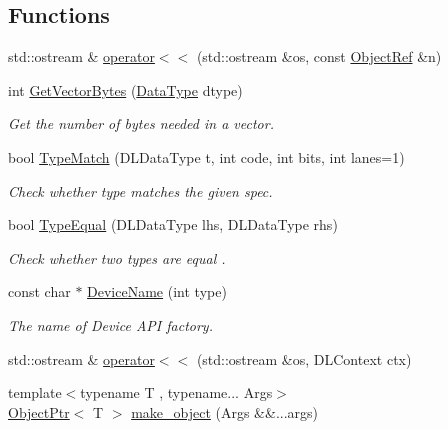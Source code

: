 \subsection*{Functions}
\begin{DoxyCompactItemize}
\item 
std\+::ostream \& \hyperlink{namespacetvm_1_1runtime_af22b89284299c81d0c1802199af446d7}{operator$<$$<$} (std\+::ostream \&os, const \hyperlink{classtvm_1_1runtime_1_1ObjectRef}{Object\+Ref} \&n)
\item 
int \hyperlink{namespacetvm_1_1runtime_ad01a53416152b68029d67190c3709d25}{Get\+Vector\+Bytes} (\hyperlink{classtvm_1_1runtime_1_1DataType}{Data\+Type} dtype)
\begin{DoxyCompactList}\small\item\em Get the number of bytes needed in a vector. \end{DoxyCompactList}\item 
bool \hyperlink{namespacetvm_1_1runtime_adbabb7cfb79bfb6d802f65a9803e4eb6}{Type\+Match} (D\+L\+Data\+Type t, int code, int bits, int lanes=1)
\begin{DoxyCompactList}\small\item\em Check whether type matches the given spec. \end{DoxyCompactList}\item 
bool \hyperlink{namespacetvm_1_1runtime_aee574cee6755b0c2f1aa664c6967686f}{Type\+Equal} (D\+L\+Data\+Type lhs, D\+L\+Data\+Type rhs)
\begin{DoxyCompactList}\small\item\em Check whether two types are equal . \end{DoxyCompactList}\item 
const char $\ast$ \hyperlink{namespacetvm_1_1runtime_a9109e4efe269213052ed6a94853c0c00}{Device\+Name} (int type)
\begin{DoxyCompactList}\small\item\em The name of Device A\+PI factory. \end{DoxyCompactList}\item 
std\+::ostream \& \hyperlink{namespacetvm_1_1runtime_a0ce391c2492dfc73b5c6c6459693c6a6}{operator$<$$<$} (std\+::ostream \&os, D\+L\+Context ctx)
\item 
{\footnotesize template$<$typename T , typename... Args$>$ }\\\hyperlink{classtvm_1_1runtime_1_1ObjectPtr}{Object\+Ptr}$<$ T $>$ \hyperlink{namespacetvm_1_1runtime_a93466f4543eedc3925c66ed0e7ef2671}{make\+\_\+object} (Args \&\&...args)

\end{DoxyCompactItemize}
